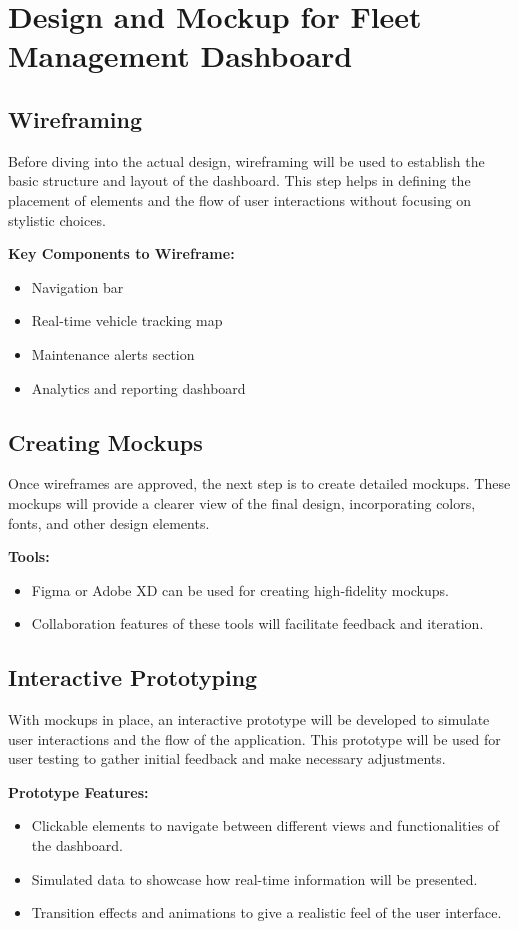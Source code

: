\section*{Design and Mockup for Fleet Management Dashboard}

\subsection*{Wireframing}
Before diving into the actual design, wireframing will be used to establish the basic structure and layout of the dashboard. This step helps in defining the placement of elements and the flow of user interactions without focusing on stylistic choices.

\textbf{Key Components to Wireframe:}
\begin{itemize}
    \item Navigation bar
    \item Real-time vehicle tracking map
    \item Maintenance alerts section
    \item Analytics and reporting dashboard
\end{itemize}

\subsection*{Creating Mockups}
Once wireframes are approved, the next step is to create detailed mockups. These mockups will provide a clearer view of the final design, incorporating colors, fonts, and other design elements.

\textbf{Tools:}
\begin{itemize}
    \item Figma or Adobe XD can be used for creating high-fidelity mockups.
    \item Collaboration features of these tools will facilitate feedback and iteration.
\end{itemize}

\subsection*{Interactive Prototyping}
With mockups in place, an interactive prototype will be developed to simulate user interactions and the flow of the application. This prototype will be used for user testing to gather initial feedback and make necessary adjustments.

\textbf{Prototype Features:}
\begin{itemize}
    \item Clickable elements to navigate between different views and functionalities of the dashboard.
    \item Simulated data to showcase how real-time information will be presented.
    \item Transition effects and animations to give a realistic feel of the user interface.
\end{itemize}

